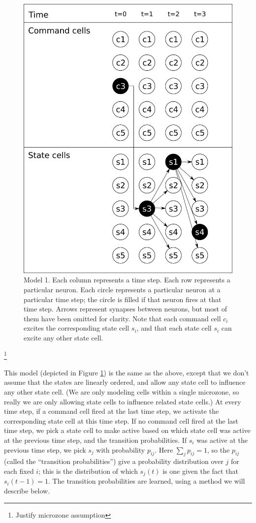 \documentclass{article}
\theoremstyle{definition}
\begin{document}
\begin{figure}
\includegraphics[width=\linewidth]{positive_model1.png}
\caption{Model 1. Each column represents a time step. Each row
  represents a particular neuron. Each circle represents a particular
  neuron at a particular time step; the circle is filled if that
  neuron fires at that time step. Arrows represent synapses between
  neurons, but most of them have been omitted for clarity. Note that
  each command cell $c_i$ excites the corresponding state cell $s_i$,
  and that each state cell $s_i$ can excite any other state cell.}
\label{fig-model1}
\end{figure}

\footnote{Justify microzone assumption}

This model (depicted in Figure \ref{fig-model1}) is the same as the
above, except that we don't assume that the states are linearly
ordered, and allow any state cell to influence any other state
cell. (We are only modeling cells within a single microzone, so really
we are only allowing state cells to influence related state cells.) At
every time step, if a command cell fired at the last time step, we
activate the corresponding state cell at this time step. If no command
cell fired at the last time step, we pick a state cell to make active
based on which state cell was active at the previous time step, and
the transition probabilities. If $s_i$ was active at the previous time
step, we pick $s_j$ with probability $p_{ij}$. Here $\sum_j p_{ij}=1$,
so the $p_{ij}$ (called the ``transition probabilities'') give a
probability distribution over $j$ for each fixed $i$; this is the
distribution of which $s_j(t)$ is one given the fact that
$s_i(t-1)=1$. The transition probabilities are learned, using a method
we will describe below.
\end{document}
